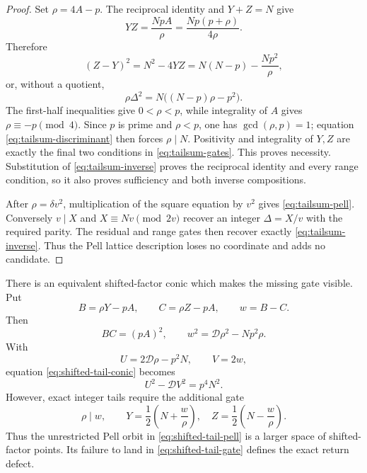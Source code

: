 \begin{proof}
Set $\rho=4A-p$.  The reciprocal identity and $Y+Z=N$ give
\[
 YZ=\frac{NpA}{\rho}=\frac{Np(p+\rho)}{4\rho}.
\]
Therefore
\[
 (Z-Y)^2=N^2-4YZ
 =N(N-p)-\frac{Np^2}{\rho},
\]
or, without a quotient,
\begin{equation}\label{eq:tailsum-discriminant}
 \rho\Delta^2=N\bigl((N-p)\rho-p^2\bigr).
\end{equation}
The first-half inequalities give $0<\rho<p$, while integrality of $A$ gives
$\rho\equiv-p\pmod4$.  Since $p$ is prime and $\rho<p$, one has
$\gcd(\rho,p)=1$; equation \eqref{eq:tailsum-discriminant} then forces
$\rho\mid N$.  Positivity and integrality of $Y,Z$ are exactly the final two
conditions in \eqref{eq:tailsum-gates}.  This proves necessity.  Substitution
of \eqref{eq:tailsum-inverse} proves the reciprocal identity and every range
condition, so it also proves sufficiency and both inverse compositions.

After $\rho=\delta v^2$, multiplication of the square equation by $v^2$
gives \eqref{eq:tailsum-pell}.  Conversely $v\mid X$ and
$X\equiv Nv\pmod{2v}$ recover an integer $\Delta=X/v$ with the required
parity.  The residual and range gates then recover exactly
\eqref{eq:tailsum-inverse}.  Thus the Pell lattice description loses no
coordinate and adds no candidate.
\end{proof}

There is an equivalent shifted-factor conic which makes the missing gate
visible.  Put
\[
 B=\rho Y-pA,\qquad C=\rho Z-pA,\qquad w=B-C.
\]
Then
\begin{equation}\label{eq:shifted-tail-conic}
 BC=(pA)^2,\qquad
 w^2=\mathcal D\rho^2-Np^2\rho.
\end{equation}
With
\[
 U=2\mathcal D\rho-p^2N,\qquad V=2w,
\]
equation \eqref{eq:shifted-tail-conic} becomes
\begin{equation}\label{eq:shifted-tail-pell}
 U^2-\mathcal D V^2=p^4N^2.
\end{equation}
However, exact integer tails require the additional gate
\begin{equation}\label{eq:shifted-tail-gate}
 \rho\mid w,\qquad
 Y=\frac12\left(N+\frac w\rho\right),\quad
 Z=\frac12\left(N-\frac w\rho\right).
\end{equation}
Thus the unrestricted Pell orbit in \eqref{eq:shifted-tail-pell} is a larger
space of shifted-factor points.  Its failure to land in
\eqref{eq:shifted-tail-gate} defines the exact return defect.

